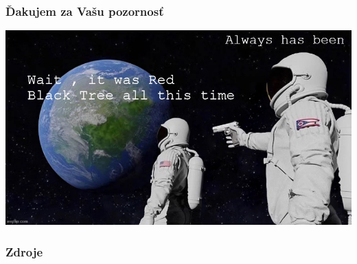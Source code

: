 \documentclass{beamer}
\begin{document}
    \begin{frame}
        \frametitle{Ďakujem za Vašu pozornosť}
        \includegraphics[width=\textwidth]{meme}
    \end{frame}

    \begin{frame}
        \frametitle{Zdroje}~\nocite{*}
        
        
    \end{frame}
\end{document}
